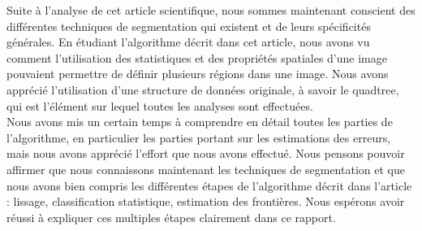 Suite à l'analyse de cet article scientifique, nous sommes maintenant conscient des différentes techniques de segmentation qui existent et de leurs spécificités générales. En étudiant l'algorithme décrit dans cet article, nous avons vu comment l'utilisation des statistiques et des propriétés spatiales d'une image pouvaient permettre de définir plusieurs régions dans une image. Nous avons apprécié l'utilisation d'une structure de données originale, à savoir le quadtree, qui est l'élément sur lequel toutes les analyses sont effectuées.\\

Nous avons mis un certain temps à comprendre en détail toutes les parties de l'algorithme, en particulier les parties portant sur les estimations des erreurs, mais nous avons apprécié l'effort que nous avons effectué. Nous pensons pouvoir affirmer que nous connaissons maintenant les techniques de segmentation et que nous avons bien compris les différentes étapes de l'algorithme décrit dans l'article : lissage, classification statistique, estimation des frontières. Nous espérons avoir réussi à expliquer ces multiples étapes clairement dans ce rapport.